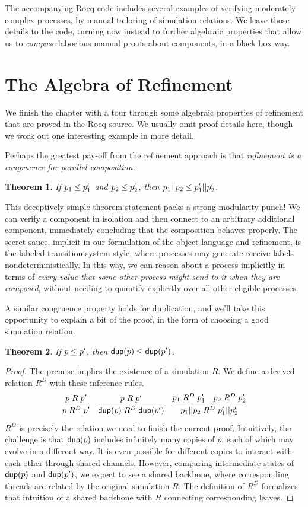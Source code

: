 \documentclass{amsbook}
\newtheorem{theorem}{Theorem}[chapter]
\theoremstyle{definition}
\theoremstyle{remark}
\numberwithin{section}{chapter}
\numberwithin{equation}{chapter}
\begin{document}
The accompanying Rocq code includes several examples of verifying moderately complex processes, by manual tailoring of simulation relations.
We leave those details to the code, turning now instead to further algebraic properties that allow us to \emph{compose} laborious manual proofs about components, in a black-box way.


\section{The Algebra of Refinement}

We finish the chapter with a tour through some algebraic properties of refinement that are proved in the Rocq source.
We usually omit proof details here, though we work out one interesting example in more detail.

Perhaps the greatest pay-off from the refinement approach is that \emph{refinement is a congruence for parallel composition}.
\begin{theorem}
  If $p_1 \leq p'_1$ and $p_2 \leq p'_2$, then $p_1 || p_2 \leq p'_1 || p'_2$.
\end{theorem}

\modularity
This deceptively simple theorem statement packs a strong modularity punch!
We can verify a component in isolation and then connect to an arbitrary additional component, immediately concluding that the composition behaves properly.
The secret sauce, implicit in our formulation of the object language and refinement, is the labeled-transition-system style, where processes may generate receive labels nondeterministically.
In this way, we can reason about a process implicitly in terms of \emph{every value that some other process might send to it when they are composed}, without needing to quantify explicitly over all other eligible processes.

A similar congruence property holds for duplication, and we'll take this opportunity to explain a bit of the proof, in the form of choosing a good simulation relation.
\begin{theorem}
  If $p \leq p'$, then $\mathsf{dup}(p) \leq \mathsf{dup}(p')$.
\end{theorem}
\begin{proof}
  The premise implies the existence of a simulation $R$.
  We define a derived relation $R^D$ with these inference rules.
  $$\infer{p \; R^D \; p'}{
    p \; R \; p'
  }
  \quad \infer{\dup{p} \; R^D \; \dup{p'}}{
    p \; R \; p'
  }
  \quad \infer{\parl{p_1}{p_2} \; R^D \; \parl{p'_1}{p'_2}}{
    p_1 \; R^D \; p'_1
    & p_2 \; R^D \; p'_2
  }$$
  $R^D$ is precisely the relation we need to finish the current proof.
  Intuitively, the challenge is that $\mathsf{dup}(p)$ includes infinitely many copies of $p$, each of which may evolve in a different way.
  It is even possible for different copies to interact with each other through shared channels.
  However, comparing intermediate states of $\mathsf{dup}(p)$ and $\mathsf{dup}(p')$, we expect to see a shared backbone, where corresponding threads are related by the original simulation $R$.
  The definition of $R^D$ formalizes that intuition of a shared backbone with $R$ connecting corresponding leaves.
\end{proof}
\end{document}
